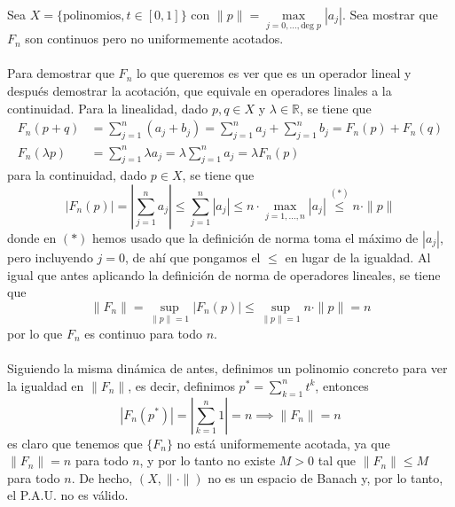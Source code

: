 \begin{ejercicio}
    Sea $X = \{ \text{polinomios}, t \in [0, 1] \}$ con $\|p\| = \max\limits_{j=0, \dots, \text{deg } p} |a_j|$. Sea 
    mostrar que $F_n$ son continuos pero no uniformemente acotados. \\ \\
    \noindent
    Para demostrar que $F_n$ lo que queremos es ver que es un operador lineal y después demostrar la acotación, que equivale en operadores linales a la continuidad. Para la linealidad, dado $p, q \in X$ y $\lambda \in \mathbb{R}$, se tiene que
    \begin{align*}
        F_n(p + q) &= \sum_{j=1}^{n} (a_j + b_j) = \sum_{j=1}^{n} a_j + \sum_{j=1}^{n} b_j = F_n(p) + F_n(q) \\
        F_n(\lambda p) &= \sum_{j=1}^{n} \lambda a_j = \lambda \sum_{j=1}^{n} a_j = \lambda F_n(p)
    \end{align*}
    para la continuidad, dado $p \in X$, se tiene que
    \begin{equation*}
        |F_n(p)| = \left|\sum_{j=1}^{n} a_j\right| \leq \sum_{j=1}^{n} |a_j| \leq n \cdot \max_{j=1,\dots,n} |a_j| \overset{(*)}{\leq} n \cdot \|p\|
    \end{equation*}
    donde en $(*)$ hemos usado que la definición de norma toma el máximo de $|a_j|$, pero incluyendo $j=0$, de ahí que pongamos el $\leq$ en lugar de la igualdad. Al igual que antes aplicando la definición de norma de operadores lineales, se tiene que
    \begin{equation*}
        \|F_n\| = \sup_{\|p\|=1} |F_n(p)| \leq \sup_{\|p\|=1} n \cdot \|p\| = n
    \end{equation*}
    por lo que $F_n$ es continuo para todo $n$. \\ \\
    \noindent
    Siguiendo la misma dinámica de antes, definimos un polinomio concreto para ver la igualdad en $\|F_n\|$, es decir, definimos $p^*=\sum\limits_{k=1}^{n} t^k$, entonces
    \begin{equation*}
        |F_n(p^*)| = \left|\sum_{k=1}^{n} 1\right| = n \implies \|F_n\| = n
    \end{equation*}
    es claro que tenemos que $\{F_n\}$ no está uniformemente acotada, ya que $\|F_n\| = n$ para todo $n$, y por lo tanto no existe $M > 0$ tal que $\|F_n\| \leq M$ para todo $n$. De hecho, $(X, \|\cdot\|)$ no es un espacio de Banach y, por lo tanto, el P.A.U. no es válido. \\ \\

\end{ejercicio}
